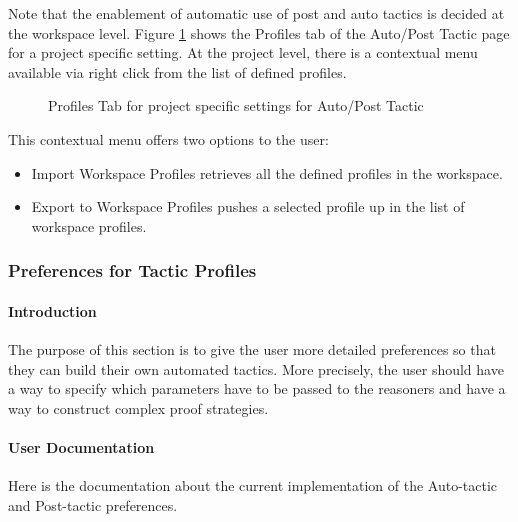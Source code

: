 Note that the enablement of automatic use of post and auto tactics is decided at the workspace level. Figure \ref{fig_ref_01_preferences12} shows the \textsf{Profiles} tab of the \textsf{Auto/Post Tactic} page for a project specific setting. At the project level, there is a contextual menu available via right click from the list of defined profiles. 

\begin{figure}[!ht]
\begin{center}
	\caption{Profiles Tab for project specific settings for Auto/Post Tactic}
	\label{fig_ref_01_preferences12}
\end{center}
\end{figure}

This contextual menu offers two options to the user:

\begin{itemize}
	\item Import Workspace Profiles retrieves all the defined profiles in the workspace.
	\item Export to Workspace Profiles pushes a selected profile up in the list of workspace profiles.
\end{itemize}

\subsubsection{Preferences for Tactic Profiles}
\label{preferences_for_the_automatic_tactics}

\paragraph{Introduction}

The purpose of this section is to give the user more detailed preferences so that they can build their own automated tactics. More precisely, the user should have a way to specify which parameters have to be passed to the reasoners and have a way to construct complex proof strategies.

\paragraph{User Documentation}

Here is the documentation about the current implementation of the Auto-tactic and Post-tactic preferences.

